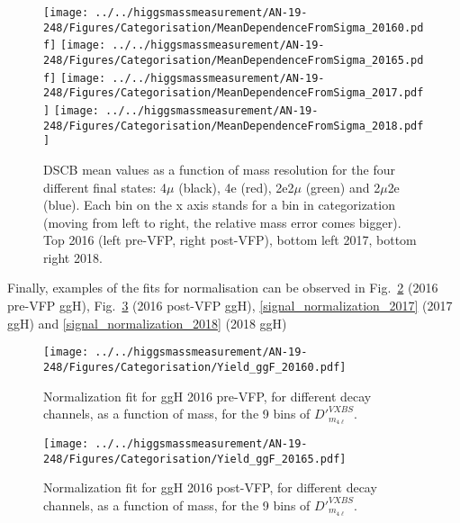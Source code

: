 \begin{figure}[!htbp]
\begin{center}
		\texttt{[image: ../../higgsmassmeasurement/AN-19-248/Figures/Categorisation/MeanDependenceFromSigma\_20160.pdf]}
		\texttt{[image: ../../higgsmassmeasurement/AN-19-248/Figures/Categorisation/MeanDependenceFromSigma\_20165.pdf]}
		\texttt{[image: ../../higgsmassmeasurement/AN-19-248/Figures/Categorisation/MeanDependenceFromSigma\_2017.pdf]}
		\texttt{[image: ../../higgsmassmeasurement/AN-19-248/Figures/Categorisation/MeanDependenceFromSigma\_2018.pdf]}
\caption{
DSCB mean values as a function of mass resolution for the four different final states: 4$\mu$ (black),
4e (red), 2e2$\mu$ (green) and 2$\mu$2e (blue). Each bin on the x axis stands for a bin 
in categorization (moving from left to right, the relative mass error comes bigger). 
Top 2016 (left pre-VFP, right post-VFP), bottom left 2017, bottom right 2018.}
\label{MeanDependence}
\end{center}
\end{figure}
Finally, examples of the fits for normalisation can be observed in 
Fig.~\ref{signal_normalization_20160} (2016 pre-VFP ggH),
Fig.~\ref{signal_normalization_20165} (2016 post-VFP ggH), 
\ref{signal_normalization_2017} (2017 ggH) and 
\ref{signal_normalization_2018} (2018 ggH)
\begin{figure}[!htbp]
\begin{center}
		\texttt{[image: ../../higgsmassmeasurement/AN-19-248/Figures/Categorisation/Yield\_ggF\_20160.pdf]}
\caption{
Normalization fit for ggH 2016 pre-VFP, for different decay channels, as a function
of mass, for the 9 bins of $D'^{VXBS}_{m_{4\ell}}$.}
\label{signal_normalization_20160}
\end{center}
\end{figure}
\begin{figure}[!htbp]
\begin{center}
		\texttt{[image: ../../higgsmassmeasurement/AN-19-248/Figures/Categorisation/Yield\_ggF\_20165.pdf]}
\caption{
Normalization fit for ggH 2016 post-VFP, for different decay channels, as a function
of mass, for the 9 bins of $D'^{VXBS}_{m_{4\ell}}$.}
\label{signal_normalization_20165}
\end{center}
\end{figure}
